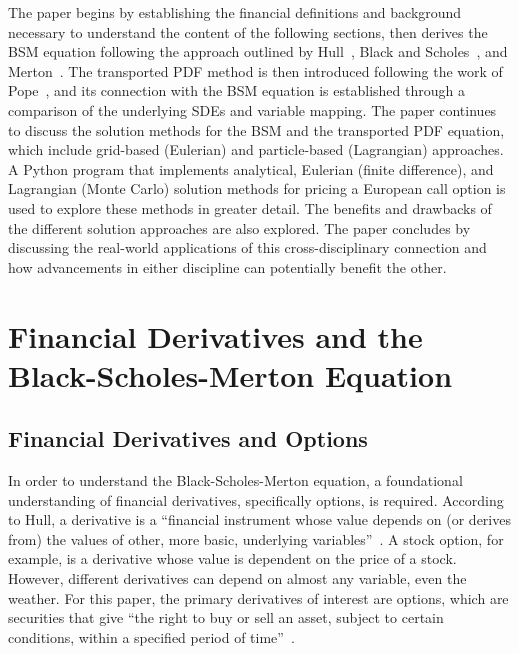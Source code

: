 \documentclass[12pt, onecolumn, journal]{IEEEtran}
\begin{document}
The paper begins by establishing the financial definitions and background necessary to understand the content of the following sections, then derives the BSM equation following the approach outlined by Hull~\cite{Hull2022}, Black and Scholes~\cite{BlackScholes1973}, and Merton~\cite{Merton1973}. The transported PDF method is then introduced following the work of Pope~\cite{Pope2000}, and its connection with the BSM equation is established through a comparison of the underlying SDEs and variable mapping. The paper continues to discuss the solution methods for the BSM and the transported PDF equation, which include grid-based (Eulerian) and particle-based (Lagrangian) approaches. A Python program that implements analytical, Eulerian (finite difference), and Lagrangian (Monte Carlo) solution methods for pricing a European call option is used to explore these methods in greater detail. The benefits and drawbacks of the different solution approaches are also explored. The paper concludes by discussing the real-world applications of this cross-disciplinary connection and how advancements in either discipline can potentially benefit the other.

\section{Financial Derivatives and the Black-Scholes-Merton Equation}

\subsection{Financial Derivatives and Options}
In order to understand the Black-Scholes-Merton equation, a foundational understanding of financial derivatives, specifically options, is required. According to Hull, a derivative is a ``financial instrument whose value depends on (or derives from) the values of other, more basic, underlying variables''~\cite{Hull2022}. A stock option, for example, is a derivative whose value is dependent on the price of a stock. However, different derivatives can depend on almost any variable, even the weather. For this paper, the primary derivatives of interest are options, which are securities that give ``the right to buy or sell an asset, subject to certain conditions, within a specified period of time''~\cite{BlackScholes1973}.
\end{document}
